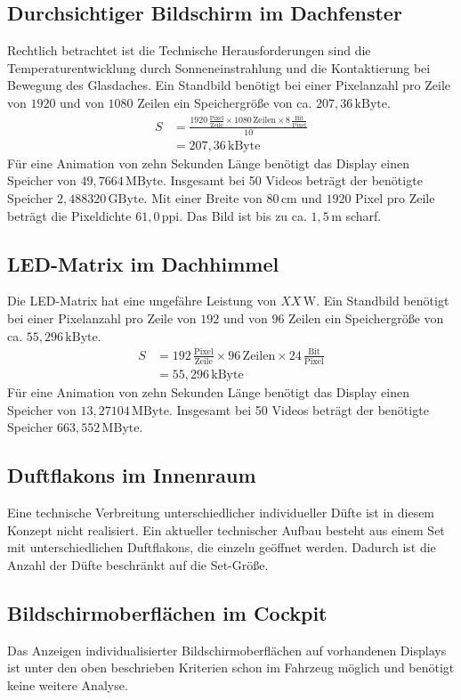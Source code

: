 \subsection{Durchsichtiger Bildschirm im Dachfenster}
Rechtlich betrachtet ist die 
Technische Herausforderungen sind die Temperaturentwicklung durch Sonneneinstrahlung und die Kontaktierung bei Bewegung des Glasdaches. 
Ein Standbild benötigt bei einer Pixelanzahl pro Zeile von $ 1920 $ und von $ 1080 $ Zeilen ein Speichergröße von ca. $ 207,36\,\mathrm{kByte}$. 
\begin{align}
	S &= \frac{1920\,\frac{\mathrm{Pixel}}{\mathrm{Zeile}}\times 1080\,\mathrm{Zeilen} \times 8\,\frac{\mathrm{Bit}}{\mathrm{Pixel}}}{10} \\
	&= 207,36\,\mathrm{kByte}
\end{align}
Für eine Animation von zehn Sekunden Länge benötigt das Display einen Speicher von $ 49,7664\,\mathrm{MByte}$.
Insgesamt bei 50 Videos beträgt der benötigte Speicher $ 2,488320\,\mathrm{GByte}$.
Mit einer Breite von $ 80\,\mathrm{cm} $ und $ 1920 $ Pixel pro Zeile beträgt die Pixeldichte $ 61,0\,\mathrm{ppi} $. Das Bild ist bis zu ca. $ 1,5\,\mathrm{m} $ scharf.
\subsection{LED-Matrix im Dachhimmel}
Die LED-Matrix hat eine ungefähre Leistung von $ XX\,\mathrm{W} $. 
Ein Standbild benötigt bei einer Pixelanzahl pro Zeile von $ 192 $ und von $ 96 $ Zeilen ein Speichergröße von ca. $ 55,296\,\mathrm{kByte}$. 
\begin{align}
	S &= 192\,\frac{\mathrm{Pixel}}{\mathrm{Zeile}}\times 96\,\mathrm{Zeilen} \times 24\,\frac{\mathrm{Bit}}{\mathrm{Pixel}} \\
	&= 55,296\,\mathrm{kByte}
\end{align}
Für eine Animation von zehn Sekunden Länge benötigt das Display einen Speicher von $ 13,27104\,\mathrm{MByte}$.
Insgesamt bei 50 Videos beträgt der benötigte Speicher $ 663,552\,\mathrm{MByte}$.
\subsection{Duftflakons im Innenraum}
Eine technische Verbreitung unterschiedlicher individueller Düfte ist in diesem Konzept nicht realisiert. Ein aktueller technischer Aufbau besteht aus einem Set mit unterschiedlichen Duftflakons, die einzeln geöffnet werden. Dadurch ist die Anzahl der Düfte beschränkt auf die Set-Größe.
\subsection{Bildschirmoberflächen im Cockpit}
Das Anzeigen individualisierter Bildschirmoberflächen auf vorhandenen Displays ist unter den oben beschrieben Kriterien schon im Fahrzeug möglich und benötigt keine weitere Analyse.
